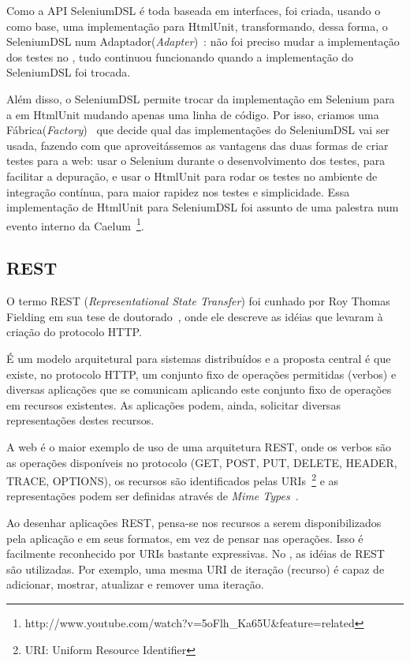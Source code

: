 Como a API SeleniumDSL é toda baseada em interfaces, foi criada, usando o \calopsita{} como base, uma implementação para HtmlUnit, transformando, dessa forma, o SeleniumDSL num Adaptador(\textit{Adapter})~\cite{gof}: não foi preciso mudar a implementação dos testes no \calopsita{}, tudo continuou funcionando quando a implementação do SeleniumDSL foi trocada. 

Além disso, o SeleniumDSL permite trocar da implementação em Selenium para a em HtmlUnit mudando apenas uma linha de código. Por isso, criamos uma Fábrica(\textit{Factory})~\cite{gof} que decide qual das implementações do SeleniumDSL vai ser usada, fazendo com que aproveitássemos as vantagens das duas formas de criar testes para a web: usar o Selenium durante o desenvolvimento dos testes, para facilitar a depuração, e usar o HtmlUnit para rodar os testes no ambiente de integração contínua, para maior rapidez nos testes e simplicidade. Essa implementação de HtmlUnit para SeleniumDSL foi assunto de uma palestra num evento interno da Caelum~\footnote{http://www.youtube.com/watch?v=5oFlh\_Ka65U\&feature=related}.

\subsection{REST}

O termo REST (\textit{Representational State Transfer}) foi cunhado por Roy Thomas Fielding em sua tese de doutorado~\cite{rest-roy}, onde ele descreve as idéias que levaram à criação do protocolo HTTP.

É um modelo arquitetural para sistemas distribuídos e a proposta central é que existe, no protocolo HTTP, um conjunto fixo de operações permitidas (verbos) e diversas aplicações que se comunicam aplicando este conjunto fixo de operações em recursos existentes. As aplicações podem, ainda, solicitar diversas representações destes recursos.

A web é o maior exemplo de uso de uma arquitetura REST, onde os verbos são as operações disponíveis no protocolo (GET, POST, PUT, DELETE, HEADER, TRACE, OPTIONS), os recursos são identificados pelas URIs~\footnote{URI: Uniform Resource Identifier} e as representações podem ser definidas através de \textit{Mime Types}~\cite{mimetypes}.

Ao desenhar aplicações REST, pensa-se nos recursos a serem disponibilizados pela aplicação e em seus formatos, em vez de pensar nas operações. Isso é facilmente reconhecido por URIs bastante expressivas. No \calopsita{}, as idéias de REST são utilizadas. Por exemplo, uma mesma URI de iteração (recurso) é capaz de adicionar, mostrar, atualizar e remover uma iteração.


